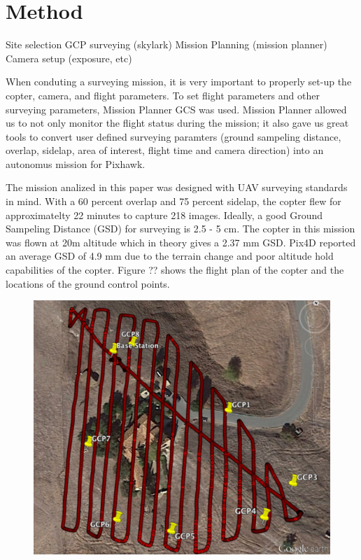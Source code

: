 \documentclass{article}
\begin{document}
\section{Method}
\label{sec:method}
Site selection
GCP surveying (skylark)
Mission Planning (mission planner)
Camera setup (exposure, etc)


When conduting a surveying mission, it is very important to properly set-up the copter, camera, and flight parameters. To set flight parameters and other surveying parameters, Mission Planner GCS was used. Mission Planner allowed us to not only monitor the flight status during the mission; it also gave us great tools to convert user defined surveying paramters (ground sampeling distance, overlap, sidelap, area of interest, flight time and camera direction) into an autonomus mission for Pixhawk.

The mission analized in this paper was designed with UAV surveying standards in mind. With a 60 percent overlap and 75 percent sidelap, the copter flew for approximatelty 22 minutes to capture 218 images. Ideally, a good Ground Sampeling Distance (GSD) for surveying is 2.5 - 5 cm. The copter in this mission was flown at 20m altitude which in theory gives a 2.37 mm GSD. Pix4D reported an average GSD of 4.9 mm due to the terrain change and poor altitude hold capabilities of the copter. Figure ?? shows the flight plan of the copter and the locations of the ground control points.

\begin{figure}
\begin{center}
\includegraphics[width=5in]{images/flight_plan_gcp.png}
\end{center}
\end{figure}
\end{document}
